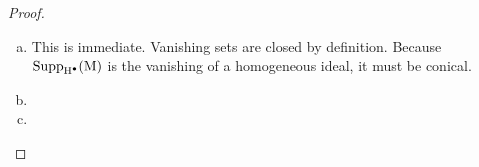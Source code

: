 \begin{proof}
  \begin{enumerate}[(a)]
  \item This is immediate. Vanishing sets are closed by definition. Because $\operatorname{Supp}_{\operatorname{H}^\bullet}(\operatorname{M})$ is the vanishing of a homogeneous ideal, it must be conical.
  \item 
  \item 
  \end{enumerate}
\end{proof}


